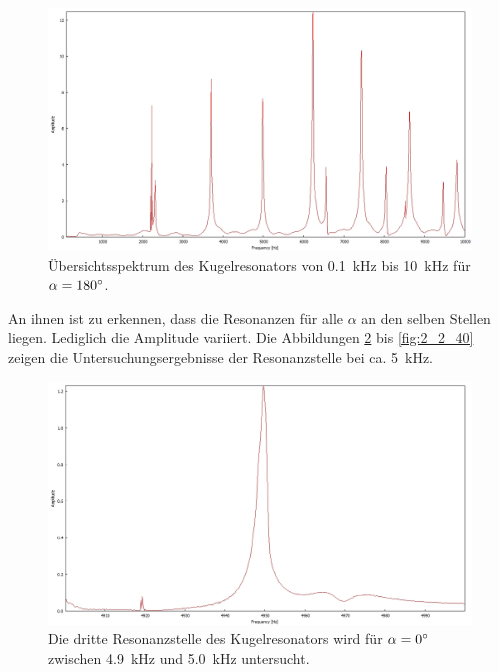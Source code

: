 \begin{figure}
\includegraphics[width=\textwidth]{content/messungen/Chapter2new/2_1_180img.jpg}
\caption{Übersichtsspektrum des Kugelresonators von 0.1~kHz bis 10~kHz für $\alpha=180\degree$.}
\label{fig:2_1_180}
\end{figure}
An ihnen ist zu erkennen, dass die Resonanzen für alle $\alpha$ an den selben Stellen liegen. 
Lediglich die Amplitude variiert.
Die Abbildungen \ref{fig:2_2_0} bis \ref{fig:2_2_40} zeigen die Untersuchungsergebnisse der Resonanzstelle bei ca. 5~kHz. 
\begin{figure}
\centering
\includegraphics[width=\textwidth]{content/messungen/Chapter2new/2_2_0img.jpg}
\caption{Die dritte Resonanzstelle des Kugelresonators wird für $\alpha=0\degree$ zwischen 4.9~kHz und 5.0~kHz untersucht.}
\label{fig:2_2_0}
\end{figure}
